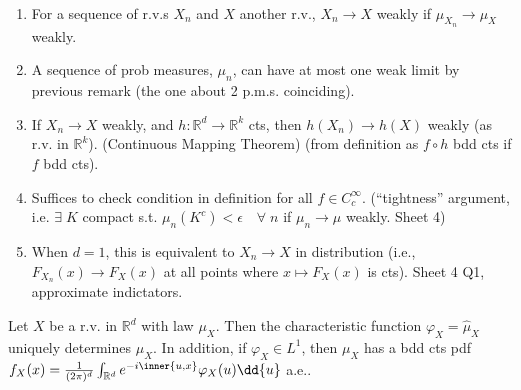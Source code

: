 \begin{remark} \
	\begin{enumerate}
		\item For a sequence of r.v.s $X_n$ and $X$ another r.v., $X_n \to X$ weakly if $\mu_{X_n} \to \mu_X$ weakly.
		\item A sequence of prob measures, $\mu_n$, can have at most one weak limit by previous remark (the one about 2 p.m.s. coinciding).
		\item If $X_n \to X$ weakly, and $h : \mathbb{R}^d \to \mathbb{R}^k$ cts, then $h(X_n) \to h(X)$ weakly (as r.v. in $\mathbb{R}^k$). (Continuous Mapping Theorem) (from definition as $f \circ h$ bdd cts if $f$ bdd cts).
		\item Suffices to check condition in definition for all $f \in C_c^\infty$. (``tightness'' argument, i.e. $\exists \; K$ compact s.t. $\mu_n(K^c) < \epsilon \quad \forall \; n$ if $\mu_n \to \mu$ weakly. Sheet 4)
		\item When $d = 1$, this is equivalent to $X_n \to X$ in distribution (i.e., $F_{X_n}(x) \to F_X(x)$ at all points where $x \mapsto F_X(x)$ is cts). Sheet 4 Q1, approximate indictators.
	\end{enumerate}
\end{remark}

\begin{theorem}
	Let $X$ be a r.v. in $\mathbb R^d$ with law $\mu_X$.
	Then the characteristic function $\varphi_X = \hat \mu_X$ uniquely determines $\mu_X$.
	In addition, if $\varphi_X \in L^1$, then $\mu_X$ has a bdd cts pdf $f_X(x) = \frac{1}{(2\pi)^d} \int_{\mathbb R^d} e^{-i\inner{u,x}} \varphi_X(u) \dd{u}$ a.e..
\end{theorem}

